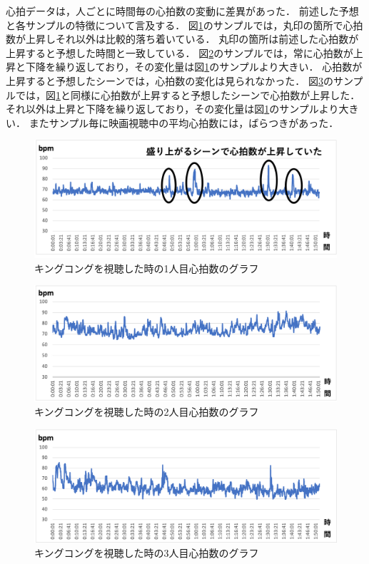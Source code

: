 心拍データは，人ごとに時間毎の心拍数の変動に差異があった．
前述した予想と各サンプルの特徴について言及する．
図\ref{hitorime}のサンプルでは，丸印の箇所で心拍数が上昇しそれ以外は比較的落ち着いている．
丸印の箇所は前述した心拍数が上昇すると予想した時間と一致している．
図\ref{sannninme}のサンプルでは，常に心拍数が上昇と下降を繰り返しており，その変化量は図\ref{hitorime}のサンプルより大きい．
心拍数が上昇すると予想したシーンでは，心拍数の変化は見られなかった．
図\ref{futarime}のサンプルでは，図\ref{hitorime}と同様に心拍数が上昇すると予想したシーンで心拍数が上昇した．
それ以外は上昇と下降を繰り返しており，その変化量は図\ref{hitorime}のサンプルより大きい．
またサンプル毎に映画視聴中の平均心拍数には，ばらつきがあった．

\begin{figure}[H]
    \centering
    \includegraphics[width=16cm]{images/chapter3/gurafusyuusei.png}
    \caption{キングコングを視聴した時の1人目心拍数のグラフ}
    \label{hitorime}
\end{figure}

\begin{figure}[H]
    \centering
    \includegraphics[width=16cm]{images/chapter3/gurafu1.png}
    \caption{キングコングを視聴した時の2人目心拍数のグラフ}
    \label{sannninme}
\end{figure}

\begin{figure}[H]
    \centering
    \includegraphics[width=16cm]{images/chapter3/gurafu.png}
    \caption{キングコングを視聴した時の3人目心拍数のグラフ}
    \label{futarime}
\end{figure}

